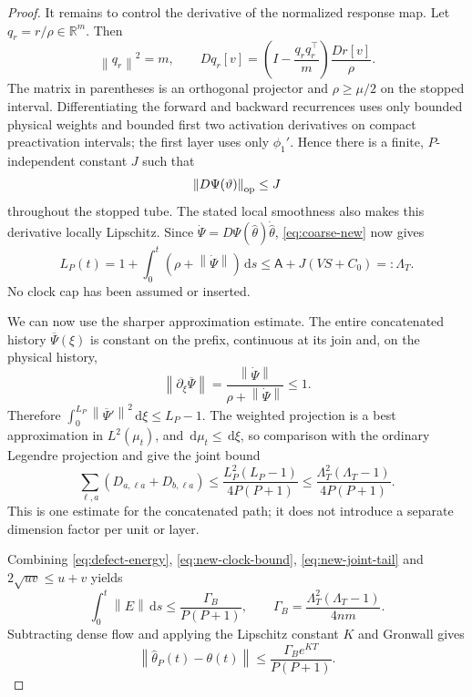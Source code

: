 \documentclass[11pt]{article}
\theoremstyle{definition}
\theoremstyle{remark}
\newcommand{\R}{\mathbb{R}}
\newcommand{\norm}[1]{\left\lVert #1\right\rVert}
\newcommand{\dd}{\,\mathrm{d}}
\begin{document}
\begin{proof}
It remains to control the derivative of the normalized response map.  Let
$q_r=r/\rho\in\R^m$.  Then
\begin{equation}
 \norm{q_r}^2=m,\qquad
 Dq_r[v]=
 \left(I-\frac{q_rq_r^\top}{m}\right)\frac{Dr[v]}{\rho}. \label{eq:normalized-residual-derivative}
\end{equation}
The matrix in parentheses is an orthogonal projector and
$\rho\ge\mu/2$ on the stopped interval.  Differentiating the forward and
backward recurrences uses only bounded physical weights and bounded first two
activation derivatives on compact preactivation intervals; the first layer
uses only $\phi_1'$.  Hence there is a finite, $P$-independent constant $J$
such that
\[
 \norm{D\Psi(\vartheta)}_{\rm op}\le J
\]
throughout the stopped tube.  The stated local smoothness also makes this
derivative locally Lipschitz.  Since
$\dot\Psi=D\Psi(\widehat\theta)\dot{\widehat\theta}$,
\eqref{eq:coarse-new} now gives
\begin{equation}
 L_P(t)=1+\int_0^t(\rho+\norm{\dot\Psi})\dd s
 \le\mathsf A+J(VS+C_0)=:\Lambda_T.                 \label{eq:new-clock-bound}
\end{equation}
No clock cap has been assumed or inserted.

We can now use the sharper approximation estimate.  The entire concatenated
history $\overline\Psi(\xi)$ is constant on the prefix, continuous at its
join and, on the physical history,
\[
 \norm{\partial_\xi\overline\Psi}
 =\frac{\norm{\dot\Psi}}{\rho+\norm{\dot\Psi}}\le1.
\]
Therefore
$\int_0^{L_P}\norm{\overline\Psi'}^2\dd\xi\le L_P-1$.
The weighted projection is a best approximation in $L^2(\mu_t)$, and
$\dd\mu_t\le\dd\xi$, so comparison with the ordinary Legendre projection and
 give the joint bound
\begin{equation}
 \sum_{\ell,a}(D_{a,\ell a}+D_{b,\ell a})
 \le\frac{L_P^2(L_P-1)}{4P(P+1)}
 \le\frac{\Lambda_T^2(\Lambda_T-1)}{4P(P+1)}.       \label{eq:new-joint-tail}
\end{equation}
This is one estimate for the concatenated path; it does not introduce a
separate dimension factor per unit or layer.

Combining \eqref{eq:defect-energy}, \eqref{eq:new-clock-bound},
\eqref{eq:new-joint-tail} and $2\sqrt{uv}\le u+v$ yields
\begin{equation}
 \int_0^t\norm E\dd s
 \le\frac{\Gamma_B}{P(P+1)},\qquad
 \Gamma_B=\frac{\Lambda_T^2(\Lambda_T-1)}{4nm}.     \label{eq:new-sharp-defect}
\end{equation}
Subtracting dense flow and applying the Lipschitz constant $K$ and Gronwall
gives
\begin{equation}
 \norm{\widehat\theta_P(t)-\theta(t)}
 \le\frac{\Gamma_Be^{KT}}{P(P+1)}.                  \label{eq:new-feedback}
\end{equation}


\end{proof}
\end{document}
